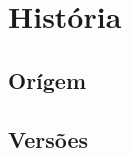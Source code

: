 \section{História}
\label{sec:historia}

\subsection{Orígem}
\label{subsec:origem}

\subsection{Versões}
\label{subsec:versoes}